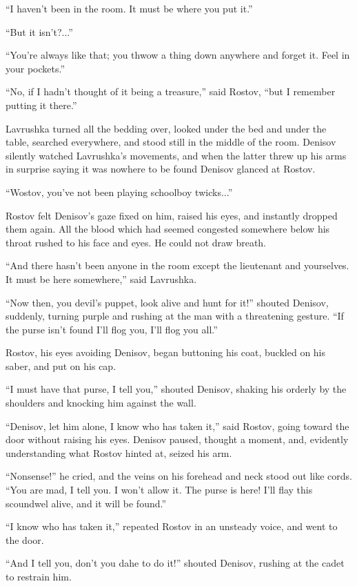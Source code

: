 ``I haven't been in the room. It must be where you put it.''

``But it isn't?...''

``You're always like that; you thwow a thing down anywhere and
forget it.  Feel in your pockets.''

``No, if I hadn't thought of it being a treasure,'' said Rostov,
``but I remember putting it there.''

Lavrushka turned all the bedding over, looked under the bed and
under the table, searched everywhere, and stood still in the
middle of the room. Denisov silently watched Lavrushka's
movements, and when the latter threw up his arms in surprise
saying it was nowhere to be found Denisov glanced at Rostov.

``Wostov, you've not been playing schoolboy twicks...''

Rostov felt Denisov's gaze fixed on him, raised his eyes, and
instantly dropped them again. All the blood which had seemed
congested somewhere below his throat rushed to his face and
eyes. He could not draw breath.

``And there hasn't been anyone in the room except the lieutenant
and yourselves. It must be here somewhere,'' said Lavrushka.

``Now then, you devil's puppet, look alive and hunt for it!''
shouted Denisov, suddenly, turning purple and rushing at the man
with a threatening gesture. ``If the purse isn't found I'll flog
you, I'll flog you all.''

Rostov, his eyes avoiding Denisov, began buttoning his coat,
buckled on his saber, and put on his cap.

``I must have that purse, I tell you,'' shouted Denisov, shaking
his orderly by the shoulders and knocking him against the wall.

``Denisov, let him alone, I know who has taken it,'' said Rostov,
going toward the door without raising his eyes. Denisov paused,
thought a moment, and, evidently understanding what Rostov hinted
at, seized his arm.

``Nonsense!'' he cried, and the veins on his forehead and neck
stood out like cords. ``You are mad, I tell you. I won't allow
it. The purse is here! I'll flay this scoundwel alive, and it
will be found.''

``I know who has taken it,'' repeated Rostov in an unsteady
voice, and went to the door.

``And I tell you, don't you dahe to do it!'' shouted Denisov,
rushing at the cadet to restrain him.

